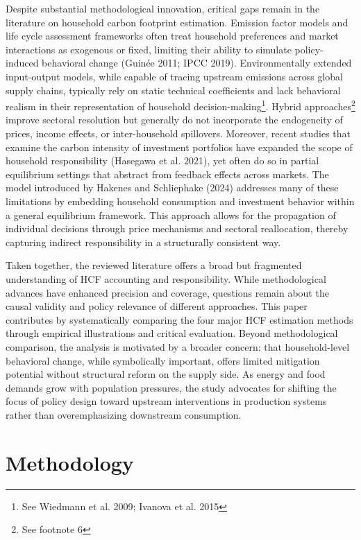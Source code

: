 \documentclass[12pt,a4paper]{article}%
\begin{document}
Despite substantial methodological innovation, critical gaps remain in the literature on household carbon footprint estimation. Emission factor models and life cycle assessment frameworks often treat household preferences and market interactions as exogenous or fixed, limiting their ability to simulate policy-induced behavioral change (Guinée 2011; IPCC 2019). Environmentally extended input-output models, while capable of tracing upstream emissions across global supply chains, typically rely on static technical coefficients and lack behavioral realism in their representation of household decision-making\footnote{See Wiedmann et al. 2009; Ivanova et al. 2015}. Hybrid approaches\footnote{See footnote 6} improve sectoral resolution but generally do not incorporate the endogeneity of prices, income effects, or inter-household spillovers. Moreover, recent studies that examine the carbon intensity of investment portfolios have expanded the scope of household responsibility (Hasegawa et al. 2021), yet often do so in partial equilibrium settings that abstract from feedback effects across markets. The model introduced by Hakenes and Schliephake (2024) addresses many of these limitations by embedding household consumption and investment behavior within a general equilibrium framework. This approach allows for the propagation of individual decisions through price mechanisms and sectoral reallocation, thereby capturing indirect responsibility in a structurally consistent way.

Taken together, the reviewed literature offers a broad but fragmented understanding of HCF accounting and responsibility. While methodological advances have enhanced precision and coverage, questions remain about the causal validity and policy relevance of different approaches. This paper contributes by systematically comparing the four major HCF estimation methods through empirical illustrations and critical evaluation. Beyond methodological comparison, the analysis is motivated by a broader concern: that household-level behavioral change, while symbolically important, offers limited mitigation potential without structural reform on the supply side. As energy and food demands grow with population pressures, the study advocates for shifting the focus of policy design toward upstream interventions in production systems rather than overemphasizing downstream consumption.

\section{Methodology}
\end{document}
